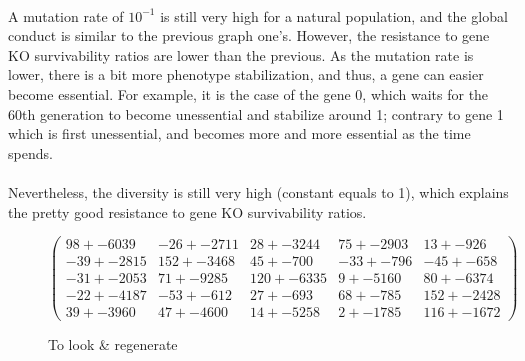 \documentclass[]{report} %
\begin{document}
    \paragraph*{}
    A mutation rate of $10^{-1}$ is still very high for a natural population, and the global conduct is similar to the previous graph one's. However, the resistance to gene KO survivability ratios are lower than the previous. As the mutation rate is lower, there is a bit more phenotype stabilization, and thus, a gene can easier become essential. For example, it is the case of the gene 0, which waits for the 60th generation to become unessential and stabilize around 1; contrary to gene 1 which is first unessential, and becomes more and more essential as the time spends.
    \paragraph*{}
    Nevertheless, the diversity is still very high (constant equals to 1), which explains the pretty good resistance to gene KO survivability ratios.
   

    \begin{figure}[H] 
            \centering
            \small
    $
            \begin{pmatrix}
                98 +- 6039 & -26 +- 2711 & 28 +- 3244 & 75 +- 2903 & 13 +- 926 \\
                -39 +- 2815 & 152 +- 3468 & 45 +- 700 & -33 +- 796 & -45 +- 658 \\
                -31 +- 2053 & 71 +- 9285 & 120 +- 6335 & 9 +- 5160 & 80 +- 6374 \\
                -22 +- 4187 & -53 +- 612 & 27 +- 693 & 68 +- 785 & 152 +- 2428 \\
                39 +- 3960 & 47 +- 4600 & 14 +- 5258 & 2 +- 1785 & 116 +- 1672 
            \end{pmatrix}
    $
            \caption{\footnotesize To look \& regenerate}
            \label{mat:ps300xg200xmr1-10-1}
    \end{figure}
    
    
\end{document}
